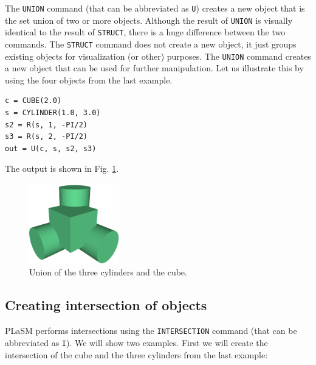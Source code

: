 The {\tt UNION} command (that can be abbreviated as {\tt U})
creates a new object that is the set union 
of two or more objects. Although the result of {\tt UNION}
is visually identical to the result of {\tt STRUCT}, 
there is a huge difference between the two commands.
The {\tt STRUCT} command does not create a new object, it just 
groups existing objects for visualization (or other)  purposes. 
The {\tt UNION} command creates a new 
object that can be used for further manipulation. Let us 
illustrate this by using the four objects from the last 
example. \\

\begin{bbox}
\begin{verbatim}
c = CUBE(2.0)
s = CYLINDER(1.0, 3.0)
s2 = R(s, 1, -PI/2)
s3 = R(s, 2, -PI/2)
out = U(c, s, s2, s3) 
\end{verbatim}
\end{bbox}
\vspace{6mm}

\noindent
The output is shown in Fig. \ref{fig:union}.\\


\begin{figure}[!ht]
\begin{center}
\includegraphics[width=0.35\textwidth]{img/diff-3.png}
\end{center}
\vspace{-4mm}
\caption{Union of the three cylinders and the cube.}
\label{fig:union}
\end{figure}


\subsection{Creating intersection of objects}\label{subsec:intersection}

PLaSM performs intersections using the {\tt INTERSECTION} command (that can be 
abbreviated as {\tt I}). We will show two examples. First we will create the 
intersection of the cube and the three cylinders from the last example:\\
 
